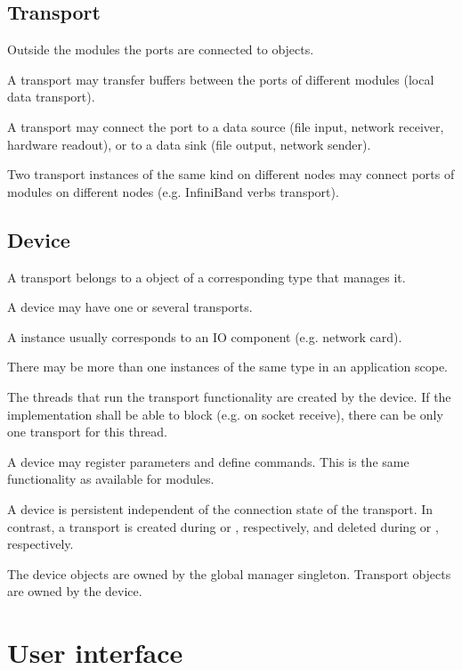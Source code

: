 \subsection{Transport}
Outside the modules the ports are connected to  objects.
\bcir
\item  A transport may transfer buffers between 
      the ports of different modules (local data transport).
\item  A transport may connect the port to a data 
      source (file input, network receiver, hardware readout), 
      or to a data sink (file output, network sender).
\item  Two transport instances of the same kind on 
      different nodes may connect ports of modules on 
      different nodes (e.g. InfiniBand verbs transport).
\ecir
\subsection{Device}
A transport belongs to a  object of a 
   corresponding type that manages it.
\bcir
\item  A device may have one or several transports.
\item  A  instance usually corresponds to an IO component (e.g. network card). 
\item  There may be more than one  instances of the same 
      type in an application scope. 
\item  The threads that run the transport functionality are 
      created by the device. If the  implementation 
      shall be able to block (e.g. on socket receive), there can be only 
      one transport for this thread. 
\item  A device may register parameters and define 
      commands. This is the same functionality as available for modules.   
\item  A device is persistent independent of the connection state 
      of the transport. In contrast, a transport is created 
      during  or , respectively,
      and deleted during  or , respectively. 
\item  The device objects are owned by the global manager 
      singleton. Transport objects are owned by the device.
\ecir

\section{User interface}
